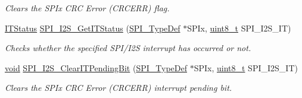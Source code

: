 \begin{DoxyCompactItemize}
\begin{DoxyCompactList}\small\item\em Clears the S\+P\+Ix C\+RC Error (C\+R\+C\+E\+RR) flag. \end{DoxyCompactList}\item 
\hyperlink{agilefox_2library_2inc_2stm32f10x__type_8h_aacbd7ed539db0aacd973a0f6eca34074}{I\+T\+Status} \hyperlink{group___s_p_i___exported___functions_ga72decbc1cd79f8fad92a2204beca6bc5}{S\+P\+I\+\_\+\+I2\+S\+\_\+\+Get\+I\+T\+Status} (\hyperlink{struct_s_p_i___type_def}{S\+P\+I\+\_\+\+Type\+Def} $\ast$S\+P\+Ix, \hyperlink{_p_e___types_8h_aba7bc1797add20fe3efdf37ced1182c5}{uint8\+\_\+t} S\+P\+I\+\_\+\+I2\+S\+\_\+\+IT)
\begin{DoxyCompactList}\small\item\em Checks whether the specified S\+P\+I/\+I2S interrupt has occurred or not. \end{DoxyCompactList}\item 
\hyperlink{usb__devapi_8h_afabf60e7f57651d6d595a02c75f07cd0}{void} \hyperlink{group___s_p_i___exported___functions_ga35a524a49ff3d058137060f751e8749f}{S\+P\+I\+\_\+\+I2\+S\+\_\+\+Clear\+I\+T\+Pending\+Bit} (\hyperlink{struct_s_p_i___type_def}{S\+P\+I\+\_\+\+Type\+Def} $\ast$S\+P\+Ix, \hyperlink{_p_e___types_8h_aba7bc1797add20fe3efdf37ced1182c5}{uint8\+\_\+t} S\+P\+I\+\_\+\+I2\+S\+\_\+\+IT)
\begin{DoxyCompactList}\small\item\em Clears the S\+P\+Ix C\+RC Error (C\+R\+C\+E\+RR) interrupt pending bit. \end{DoxyCompactList}\end{DoxyCompactItemize}
